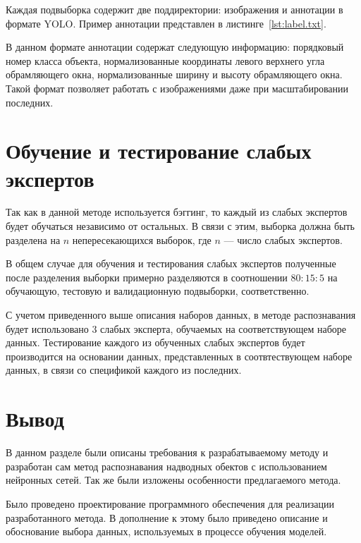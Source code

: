 Каждая подвыборка содержит две поддиректории: изображения и аннотации в формате YOLO. Пример аннотации представлен в листинге~\ref{lst:label.txt}.


В данном формате аннотации содержат следующую информацию: порядковый номер класса объекта, нормализованные координаты левого верхнего угла обрамляющего окна, нормализованные ширину и высоту обрамляющего окна. Такой формат позволяет работать с изображениями даже при масштабировании последних.

\section{Обучение и тестирование слабых экспертов}

Так как в данной методе используется бэггинг, то каждый из слабых экспертов будет обучаться независимо от остальных. В связи с этим, выборка должна быть разделена на $n$ непересекающихся выборок, где $n$ --- число слабых экспертов.

В общем случае для обучения и тестирования слабых экспертов полученные после разделения выборки примерно разделяются в соотношении $80:15:5$ на обучающую, тестовую и валидационную подвыборки, соответственно.

С учетом приведенного выше описания наборов данных, в методе распознавания будет использовано 3 слабых эксперта, обучаемых на соответствующем наборе данных. Тестирование каждого из обученных слабых экспертов будет производится на основании данных, представленных в соотвтествующем наборе данных, в связи со спецификой каждого из последних.

\section{Вывод}

В данном разделе были описаны требования к разрабатываемому методу и разработан сам метод распознавания надводных обектов с использованием нейронных сетей. Так же были изложены особенности предлагаемого метода. 

Было проведено проектирование программного обеспечения для реализации разработанного метода. В дополнение к этому было приведено описание и обоснование выбора данных, используемых в процессе обучения моделей. 
